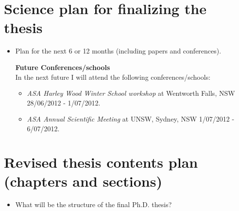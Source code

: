 \documentclass[useAMS,usenatbib,onecolumn]{mnras}
\begin{document}

\section{Science plan for finalizing the thesis}
\label{sec:sciencePlan}

\begin{itemize}
  \item{Plan for the next 6 or 12 months (including papers and conferences). \\}

  \textbf{Future Conferences/schools\\}
  In the next future I will attend the following conferences/schools:
  \begin{itemize}
    \item{\textit{ASA Harley Wood Winter School workshop}} at Wentworth Falls, NSW 28/06/2012 - 1/07/2012.
    \item{\textit{ASA Annual Scientific Meeting}} at UNSW, Sydney, NSW 1/07/2012 - 6/07/2012.
  \end{itemize}

\end{itemize}


\section{Revised thesis contents plan (chapters and sections)}
\label{sec:thesisContents}

\begin{itemize}
  \item{What will be the structure of the final Ph.D. thesis?\\}
\end{itemize}
\end{document}
